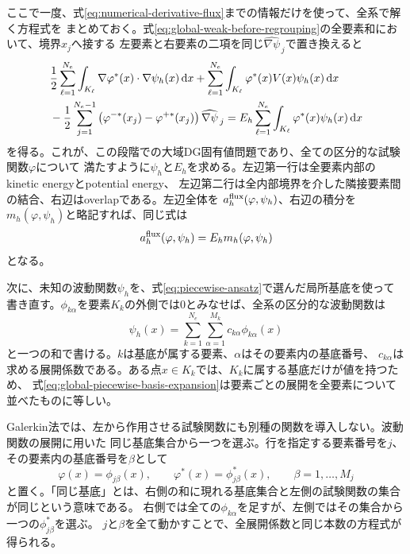 \documentclass[11pt,a4paper]{article}
\newcommand{\dd}{\mathrm d}
\begin{document}
ここで一度、式\eqref{eq:numerical-derivative-flux}までの情報だけを使って、全系で解く方程式を
まとめておく。式\eqref{eq:global-weak-before-regrouping}の全要素和において、境界$x_j$へ接する
左要素と右要素の二項を同じ$\widehat{\nabla\psi}_{\,j}$で置き換えると
\begin{align}
 &\frac12\sum_{\ell=1}^{N_e}\int_{K_\ell}
 \nabla\varphi^*(x)\cdot\nabla\psi_h(x)\,\dd x
 +\sum_{\ell=1}^{N_e}\int_{K_\ell}
 \varphi^*(x)V(x)\psi_h(x)\,\dd x \notag\\
 &-\frac12\sum_{j=1}^{N_e-1}
 \left(\varphi^{-*}(x_j)-\varphi^{+*}(x_j)\right)
 \widehat{\nabla\psi}_{\,j}
 =E_h\sum_{\ell=1}^{N_e}\int_{K_\ell}
 \varphi^*(x)\psi_h(x)\,\dd x
 \label{eq:current-global-dg-equation}
\end{align}
を得る。これが、この段階での大域DG固有値問題であり、全ての区分的な試験関数$\varphi$について
満たすように$\psi_h$と$E_h$を求める。左辺第一行は全要素内部のkinetic energyとpotential energy、
左辺第二行は全内部境界を介した隣接要素間の結合、右辺はoverlapである。左辺全体を
$a_h^{\rm flux}(\varphi,\psi_h)$、右辺の積分を$m_h(\varphi,\psi_h)$と略記すれば、同じ式は
\[
 a_h^{\rm flux}(\varphi,\psi_h)=E_hm_h(\varphi,\psi_h)
\]
となる。

次に、未知の波動関数$\psi_h$を、式\eqref{eq:piecewise-ansatz}で選んだ局所基底を使って
書き直す。$\phi_{k\alpha}$を要素$K_k$の外側では0とみなせば、全系の区分的な波動関数は
\begin{equation}
 \psi_h(x)=\sum_{k=1}^{N_e}\sum_{\alpha=1}^{M_k}c_{k\alpha}\phi_{k\alpha}(x)
 \label{eq:global-piecewise-basis-expansion}
\end{equation}
と一つの和で書ける。$k$は基底が属する要素、$\alpha$はその要素内の基底番号、
$c_{k\alpha}$は求める展開係数である。ある点$x\in K_k$では、$K_k$に属する基底だけが値を持つため、
式\eqref{eq:global-piecewise-basis-expansion}は要素ごとの展開を全要素について並べたものに等しい。

Galerkin法では、左から作用させる試験関数にも別種の関数を導入しない。波動関数の展開に用いた
同じ基底集合から一つを選ぶ。行を指定する要素番号を$j$、その要素内の基底番号を$\beta$として
\begin{equation}
 \varphi(x)=\phi_{j\beta}(x),
 \qquad
 \varphi^*(x)=\phi_{j\beta}^*(x),
 \qquad \beta=1,\ldots,M_j
 \label{eq:same-galerkin-test-basis}
\end{equation}
と置く。「同じ基底」とは、右側の和に現れる基底集合と左側の試験関数の集合が同じという意味である。
右側では全ての$\phi_{k\alpha}$を足すが、左側ではその集合から一つの$\phi_{j\beta}^*$を選ぶ。
$j$と$\beta$を全て動かすことで、全展開係数と同じ本数の方程式が得られる。
\end{document}
